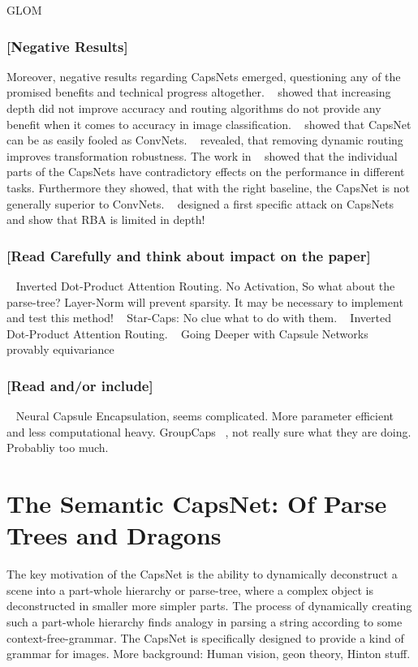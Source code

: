 \documentclass{article}
\begin{document}
GLOM ~\cite{corr/Hinton2021}

\subsubsection*{[Negative Results]}
Moreover, negative results regarding CapsNets emerged, questioning any of the promised benefits and technical progress altogether.
~\cite{acml/PaikKK19} showed that increasing depth did not improve accuracy and routing algorithms do not provide any benefit when it comes to accuracy in image classification.
~\cite{corr/michels2019} showed that CapsNet can be as easily fooled as ConvNets.
~\cite{ieee/Gu2020} revealed, that removing dynamic routing improves transformation robustness.
The work in ~\cite{cvpr/GuT021} showed that the individual parts of the CapsNets have contradictory effects on the performance in different tasks. Furthermore they showed, that with the right baseline, the CapsNet is not generally superior to ConvNets.
~\cite{iclr/Gu2021} designed a first specific attack on CapsNets and
\cite{prl/PeerSR21} show that RBA is limited in depth!


\subsubsection*{[Read Carefully and think about impact on the paper]}
~\cite{iclr/TsaiSGS20} Inverted Dot-Product Attention Routing. No Activation, So what about the parse-tree? Layer-Norm will prevent sparsity. It may be necessary to implement and test this method!
~\cite{nips/AhmedT19} Star-Caps: No clue what to do with them.
~\cite{iclr/TsaiSGS20} Inverted Dot-Product Attention Routing.
 ~\cite{cvpr/RajasegaranJJJS19} Going Deeper with Capsule Networks
~\cite{nips/LenssenFL18} provably equivariance

\subsubsection*{[Read and/or include]}
~\cite{eccv/LiGDOW18} Neural Capsule Encapsulation, seems complicated. More parameter efficient and less computational heavy.
GroupCaps ~\cite{cvpr/ChenJSWS18}, not really sure what they are doing. Probabliy too much.

\section{The Semantic CapsNet: Of Parse Trees and Dragons}

The key motivation of the CapsNet is the ability to dynamically deconstruct a scene into a part-whole hierarchy or parse-tree, where a complex object is deconstructed in smaller more simpler parts.
The process of dynamically creating such a part-whole hierarchy finds analogy in parsing a string according to some context-free-grammar.
The CapsNet is specifically designed to provide a kind of grammar for images.
More background: Human vision, geon theory, Hinton stuff.
\end{document}
